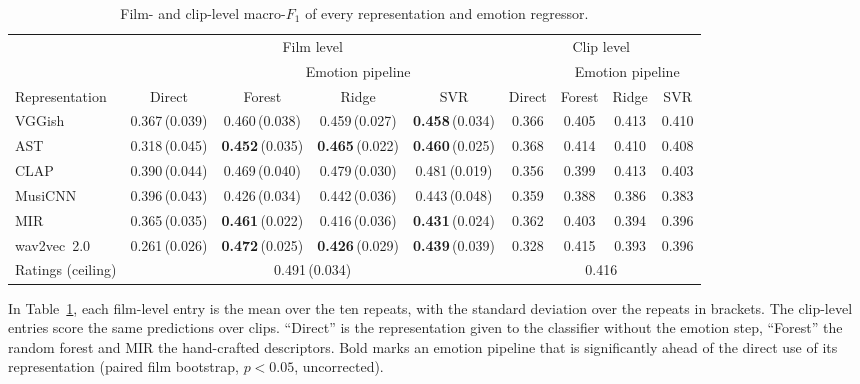 \begin{table}[H]
  \centering
  \small
  \caption{Film- and clip-level macro-$F_1$ of every representation and emotion regressor.}
  \label{tab:emotion_grid}
  \setlength{\tabcolsep}{2pt}
  \begin{tabular}{lcccc@{\hspace{10pt}}cccc}
    \toprule
    & \multicolumn{4}{c}{Film level} & \multicolumn{4}{c}{Clip level} \\
    \cmidrule(lr){2-5} \cmidrule(lr){6-9}
    & & \multicolumn{3}{c}{Emotion pipeline} & & \multicolumn{3}{c}{Emotion pipeline} \\
    \cmidrule(lr){3-5} \cmidrule(lr){7-9}
    Representation & Direct & Forest & Ridge & SVR & Direct & Forest & Ridge & SVR \\
    \midrule
    VGGish & 0.367\,{\scriptsize(0.039)} & 0.460\,{\scriptsize(0.038)} & 0.459\,{\scriptsize(0.027)} & \textbf{0.458}\,{\scriptsize(0.034)} & 0.366 & 0.405 & 0.413 & 0.410 \\
    AST & 0.318\,{\scriptsize(0.045)} & \textbf{0.452}\,{\scriptsize(0.035)} & \textbf{0.465}\,{\scriptsize(0.022)} & \textbf{0.460}\,{\scriptsize(0.025)} & 0.368 & 0.414 & 0.410 & 0.408 \\
    CLAP & 0.390\,{\scriptsize(0.044)} & 0.469\,{\scriptsize(0.040)} & 0.479\,{\scriptsize(0.030)} & 0.481\,{\scriptsize(0.019)} & 0.356 & 0.399 & 0.413 & 0.403 \\
    MusiCNN & 0.396\,{\scriptsize(0.043)} & 0.426\,{\scriptsize(0.034)} & 0.442\,{\scriptsize(0.036)} & 0.443\,{\scriptsize(0.048)} & 0.359 & 0.388 & 0.386 & 0.383 \\
    MIR & 0.365\,{\scriptsize(0.035)} & \textbf{0.461}\,{\scriptsize(0.022)} & 0.416\,{\scriptsize(0.036)} & \textbf{0.431}\,{\scriptsize(0.024)} & 0.362 & 0.403 & 0.394 & 0.396 \\
    wav2vec~2.0 & 0.261\,{\scriptsize(0.026)} & \textbf{0.472}\,{\scriptsize(0.025)} & \textbf{0.426}\,{\scriptsize(0.029)} & \textbf{0.439}\,{\scriptsize(0.039)} & 0.328 & 0.415 & 0.393 & 0.396 \\
    \midrule
    Ratings (ceiling) & \multicolumn{4}{c}{0.491\,{\scriptsize(0.034)}} & \multicolumn{4}{c}{0.416} \\
    \bottomrule
  \end{tabular}
\end{table}

In Table~\ref{tab:emotion_grid}, each film-level entry is the mean over the ten repeats,
with the standard deviation over the repeats in brackets. The clip-level entries score the
same predictions over clips. ``Direct'' is the representation given to the classifier
without the emotion step, ``Forest'' the random forest and MIR the hand-crafted
descriptors. Bold marks an emotion pipeline that is significantly ahead of the direct use of its representation (paired film bootstrap, $p<0.05$, uncorrected).

